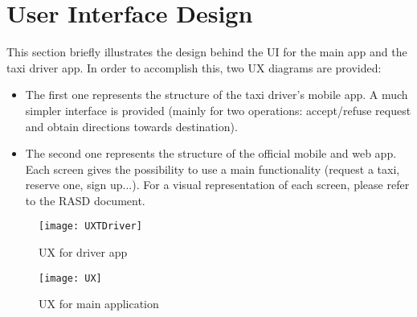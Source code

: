 \pagebreak
\section{User Interface Design}
\label{sec:ui}
This section briefly illustrates the design behind the UI for the main app and the taxi driver app. In order to accomplish this, two UX diagrams are provided:
\begin{itemize}
    \item The first one represents the structure of the taxi driver's mobile app. A much simpler interface is provided (mainly for two operations: accept/refuse request and obtain directions towards destination). 
	\item The second one represents the structure of the official mobile and web app. Each screen gives the possibility to use a main functionality (request a taxi, reserve one, sign up...). For a visual representation of each screen, please refer to the RASD document.
	
\end{itemize}

\begin{figure}[bth]
    \centering
    \texttt{[image: UXTDriver]}
    \caption{UX for driver app}
    \label{fig:ux2}
\end{figure}

\begin{figure}
    \centering
    \texttt{[image: UX]}
    \caption{UX for main application}
    \label{fig:ux1}
\end{figure}

